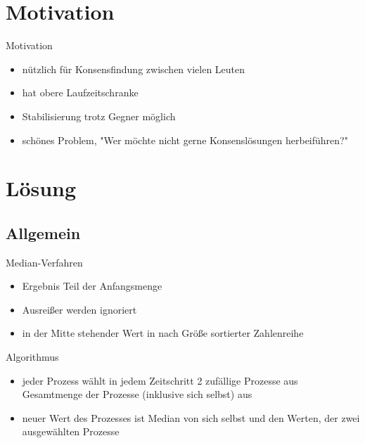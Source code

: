 \documentclass{beamer}
\begin{document}
    \section{Motivation}
    \begin{frame}{Motivation}
        \begin{itemize}
            \item nützlich für Konsensfindung zwischen vielen Leuten
            \vfill
            \item hat obere Laufzeitschranke
            \vfill
            \item Stabilisierung trotz Gegner möglich
            \vfill
            \item schönes Problem, "Wer möchte nicht gerne Konsenslösungen
                  herbeiführen?"
        \end{itemize}
    \end{frame}

    \section{Lösung}
    \subsection{Allgemein}

    \begin{frame}{Median-Verfahren}
        \begin{itemize}
            \item Ergebnis Teil der Anfangsmenge
            \vfill
            \item Ausreißer werden ignoriert
            \vfill
            \item in der Mitte stehender Wert in nach Größe sortierter
                  Zahlenreihe
        \end{itemize}
    \end{frame}

    \begin{frame}{Algorithmus}
        \begin{itemize}
            \item jeder Prozess wählt in jedem Zeitschritt 2 zufällige
                  Prozesse aus Gesamtmenge der Prozesse (inklusive sich selbst)
                  aus
            \vfill
            \item neuer Wert des Prozesses ist Median von sich selbst und den
                  Werten, der zwei ausgewählten Prozesse
        \end{itemize}
    \end{frame}
\end{document}
